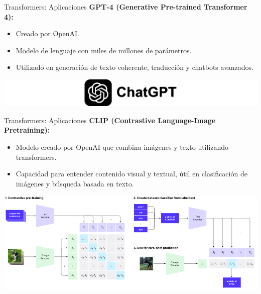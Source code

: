 \documentclass[aspectratio=169]{beamer}
\begin{document}
\begin{frame}[t]{Transformers: Aplicaciones}
  \textbf{GPT-4 (Generative Pre-trained Transformer 4):}
  \begin{itemize}
    \item Creado por OpenAI.
    \item Modelo de lenguaje con miles de millones de parámetros.
    \item Utilizado en generación de texto coherente, traducción y chatbots avanzados.
  \end{itemize}
  \vspace{1cm}
  \includegraphics[width=\textwidth, center]{imgs/tema4/att/chatgpt-3.pdf}

\end{frame}

\begin{frame}[t]{Transformers: Aplicaciones}
  \textbf{CLIP (Contrastive Language-Image Pretraining):}
  \begin{itemize}
    \item Modelo creado por OpenAI que combina imágenes y texto utilizando transformers.
    \item Capacidad para entender contenido visual y textual, útil en clasificación de imágenes y búsqueda basada en texto.
  \end{itemize}
  \vspace{.5cm}
  \includegraphics[width=.75\textwidth, center]{imgs/tema4/att/clip.png}
\end{frame}

\end{document}
